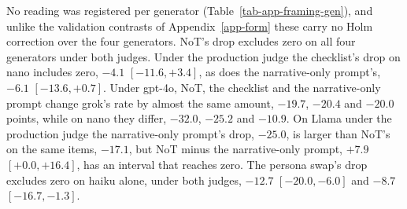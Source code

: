 No reading was registered per generator (Table~\ref{tab-app-framing-gen}),
and unlike the validation contrasts of Appendix~\ref{app-form} these carry no
Holm correction over the four generators. NoT's drop excludes zero on all
four generators under both judges. Under the
production judge the checklist's drop on nano includes zero, $-4.1$
$[-11.6, +3.4]$, as does the narrative-only prompt's, $-6.1$
$[-13.6, +0.7]$.
Under gpt-4o, NoT, the checklist and the narrative-only prompt change grok's
rate by almost the same amount, $-19.7$, $-20.4$ and $-20.0$ points, while on
nano they differ, $-32.0$, $-25.2$ and $-10.9$.
On Llama under the production judge the narrative-only prompt's drop,
$-25.0$, is larger than NoT's on the same items, $-17.1$, but NoT minus the
narrative-only prompt, $+7.9$ $[+0.0, +16.4]$, has an interval that reaches
zero.
The persona swap's drop excludes zero on haiku alone, under both judges,
$-12.7$ $[-20.0, -6.0]$ and $-8.7$ $[-16.7, -1.3]$.


